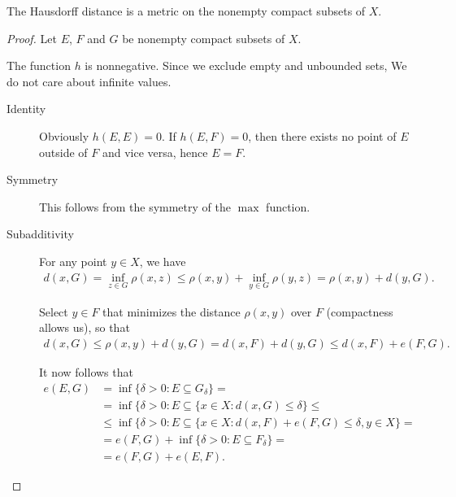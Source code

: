 \begin{proposition}
  The Hausdorff distance is a metric on the nonempty compact subsets of $X$.
\end{proposition}
\begin{proof}
  Let $E$, $F$ and $G$ be nonempty compact subsets of $X$.

  The function $h$ is nonnegative. Since we exclude empty and unbounded sets, We do not care about infinite values.

  \begin{description}
    \item[Identity] Obviously $h(E, E) = 0$. If $h(E, F) = 0$, then there exists no point of $E$ outside of $F$ and vice versa, hence $E = F$.
    \item[Symmetry] This follows from the symmetry of the $\max$ function.
    \item[Subadditivity] For any point $y \in X$, we have
    \begin{align*}
      d(x, G)
      =
      \inf_{z \in G} \rho(x, z)
      \leq
      \rho(x, y) + \inf_{y \in G} \rho(y, z)
      =
      \rho(x, y) + d(y, G).
    \end{align*}

    Select $y \in F$ that minimizes the distance $\rho(x, y)$ over $F$ (compactness allows us), so that %
    \begin{align*}
      d(x, G)
      \leq
      \rho(x, y) + d(y, G)
      =
      d(x, F) + d(y, G)
      \leq
      d(x, F) + e(F, G).
    \end{align*}

    It now follows that
    \begin{align*}
      e(E, G)
      &=
      \inf \{\delta > 0 \colon E \subseteq G_\delta \}
      = \\ &=
      \inf \{\delta > 0 \colon E \subseteq \{ x \in X \colon d(x, G) \leq \delta \}
      \leq \\ &\leq
      \inf \{\delta > 0 \colon E \subseteq \{ x \in X \colon d(x, F) + e(F, G) \leq \delta, y \in X \}
      = \\ &=
      e(F, G) + \inf \{\delta > 0 \colon E \subseteq F_\delta \}
      = \\ &=
      e(F, G) + e(E, F).
    \end{align*}
  \end{description}
\end{proof}
